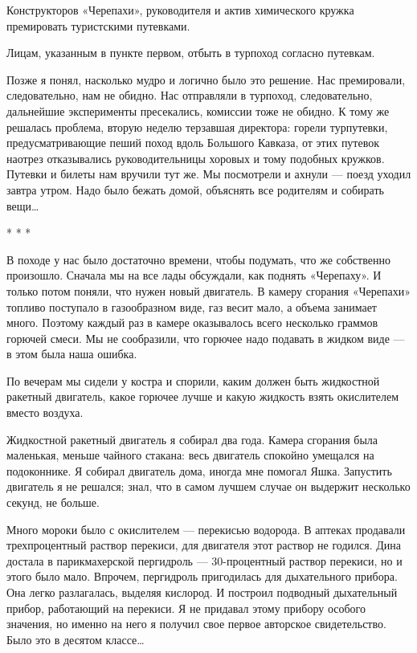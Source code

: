 Конструкторов  «Черепахи»,   руководителя   и  актив   химического   кружка
премировать туристскими путевками.

Лицам, указанным в пункте первом, отбыть в турпоход согласно путевкам.

Позже  я  понял,  насколько  мудро   и  логично  было  это  решение.   Нас
премировали, следовательно,  нам не  обидно.  Нас отправляли  в  турпоход,
следовательно,  дальнейшие  эксперименты  пресекались,  комиссии  тоже  не
обидно. К тому  же решалась проблема,  вторую неделю терзавшая  директора:
горели турпутевки, предусматривающие пеший  поход вдоль Большого  Кавказа,
от этих  путевок  наотрез  отказывались руководительницы  хоровых  и  тому
подобных кружков. Путевки  и билеты нам  вручили тут же.  Мы посмотрели  и
ахнули — поезд уходил завтра утром. Надо было бежать домой, объяснять  все
родителям и собирать вещи…

* * *

В походе у нас было достаточно времени, чтобы подумать, что же  собственно
произошло. Сначала мы  на все  лады обсуждали, как  поднять «Черепаху».  И
только  потом  поняли,  что  нужен  новый  двигатель.  В  камеру  сгорания
«Черепахи» топливо поступало в газообразном виде, газ весит мало, а объема
занимает много. Поэтому  каждый раз в  камере оказывалось всего  несколько
граммов горючей  смеси. Мы  не  сообразили, что  горючее надо  подавать  в
жидком виде — в этом была наша ошибка.

По вечерам мы  сидели у  костра и  спорили, каким  должен быть  жидкостной
ракетный двигатель, какое горючее лучше и какую жидкость взять окислителем
вместо воздуха.

Жидкостной ракетный двигатель  я собирал  два года.  Камера сгорания  была
маленькая, меньше  чайного стакана:  весь двигатель  спокойно умещался  на
подоконнике. Я собирал двигатель дома, иногда мне помогал Яшка.  Запустить
двигатель я  не решался;  знал,  что в  самом  лучшем случае  он  выдержит
несколько секунд, не больше.

Много мороки было с окислителем — перекисью водорода. В аптеках  продавали
трехпроцентный раствор перекиси,  для двигателя этот  раствор не  годился.
Дина достала в парикмахерской пергидроль — 30-процентный раствор перекиси,
но и этого  было мало.  Впрочем, пергидроль  пригодилась для  дыхательного
прибора. Она  легко разлагалась,  выделяя кислород.  И построил  подводный
дыхательный прибор, работающий  на перекиси. Я  не придавал этому  прибору
особого значения,  но  именно на  него  я получил  свое  первое  авторское
свидетельство. Было это в десятом классе…

